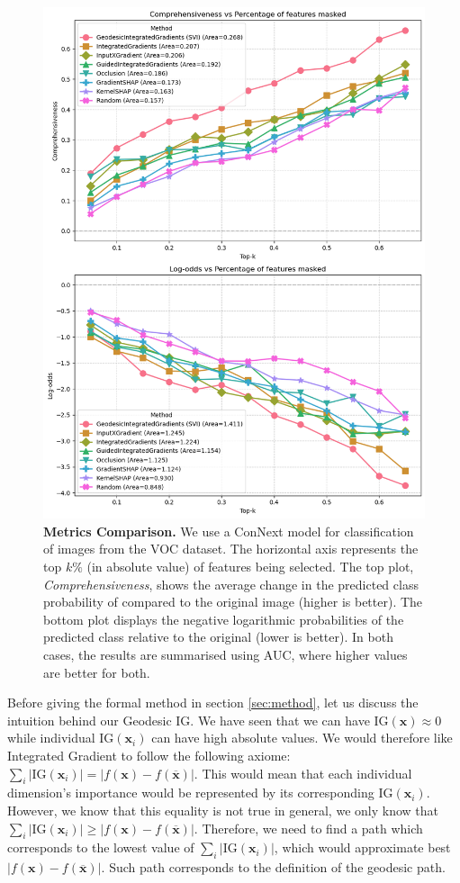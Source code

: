 \begin{figure}[!hbp]
	\vskip 0.2in
	\begin{center}
		\includegraphics[width=0.85\columnwidth]{figures/voc_metrics_vertical.png}
		\caption{ \textbf{Metrics Comparison.} We use a ConNext model for classification of images from the VOC dataset. The horizontal axis represents the top $k\%$ (in absolute value) of features being selected. The top plot, \textit{Comprehensiveness}, shows the average change in the predicted class probability of compared to the original image (higher is better). The bottom plot displays the negative logarithmic probabilities of the predicted class relative to the original (lower is better). In both cases, the results are summarised using AUC, where higher values are better for both.}
		\label{fig:voc_metrics}
	\end{center}
	\vskip -0.2in
\end{figure}

Before giving the formal method in section \ref{sec:method}, let us discuss the intuition behind our Geodesic IG. We have seen that we can have $\text{IG}(\textbf{x}) \approx 0$ while individual $\text{IG}(\textbf{x}_i)$ can have high absolute values. We would therefore like Integrated Gradient to follow the following axiome: $\sum_i{|\text{IG}(\textbf{x}_i)|} = |f(\textbf{x}) - f(\overline{\textbf{x}})|$. This would mean that each individual dimension's importance would be represented by its corresponding $\text{IG}(\textbf{x}_i)$. However, we know that this equality is not true in general, we only know that $\sum_i{|\text{IG}(\textbf{x}_i)|} \geq |f(\textbf{x}) - f(\overline{\textbf{x}})|$. Therefore, we need to find a path which corresponds to the lowest value of $\sum_i{|\text{IG}(\textbf{x}_i)|}$, which would approximate best $|f(\textbf{x}) - f(\overline{\textbf{x}})|$. Such path corresponds to the definition of the geodesic path.

